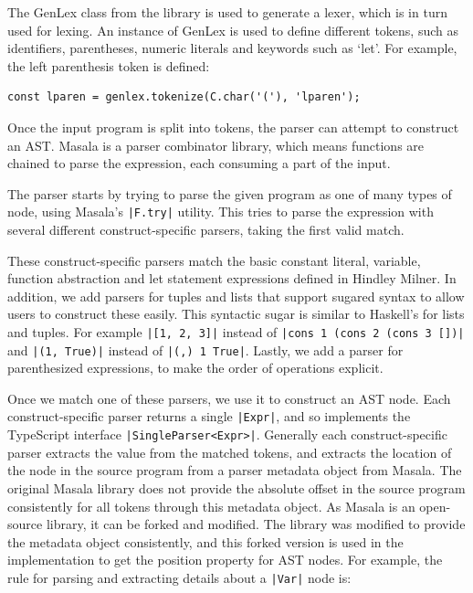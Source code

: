 \documentclass[a4paper,fleqn,12pt]{article}
\begin{document}
The GenLex class from the library is used to generate a lexer, which is in turn used for lexing. An instance of GenLex is used to define different tokens, such as identifiers, parentheses, numeric literals and keywords such as ‘let’. For example, the left parenthesis token is defined:

\begin{verbatim}
const lparen = genlex.tokenize(C.char('('), 'lparen');
\end{verbatim}

Once the input program is split into tokens, the parser can attempt to construct an AST. Masala is a parser combinator library, which means functions are chained to parse the expression, each consuming a part of the input.

The parser starts by trying to parse the given program as one of many types of node, using Masala’s \texttt{|F.try|} utility. This tries to parse the expression with several different construct-specific parsers, taking the first valid match.

These construct-specific parsers match the basic constant literal, variable, function abstraction and let statement expressions defined in Hindley Milner. In addition, we add parsers for tuples and lists that support sugared syntax to allow users to construct these easily. This syntactic sugar is similar to Haskell’s for lists and tuples. For example \texttt{|[1, 2, 3]|} instead of  \texttt{|cons 1 (cons 2 (cons 3 [])|} and \texttt{|(1, True)|} instead of \texttt{|(,) 1 True|}. Lastly, we add a parser for parenthesized expressions, to make the order of operations explicit.

Once we match one of these parsers, we use it to construct an AST node. Each construct-specific parser returns a single \texttt{|Expr|}, and so implements the TypeScript interface \texttt{|SingleParser<Expr>|}. Generally each construct-specific parser extracts the value from the matched tokens, and extracts the location of the node in the source program from a parser metadata object from Masala. The original Masala library does not provide the absolute offset in the source program consistently for all tokens through this metadata object. As Masala is an open-source library, it can be forked and modified. The library was modified to provide the metadata object consistently, and this forked version is used in the implementation to get the position property for AST nodes. For example, the rule for parsing and extracting details about a \texttt{|Var|} node is:
\end{document}
